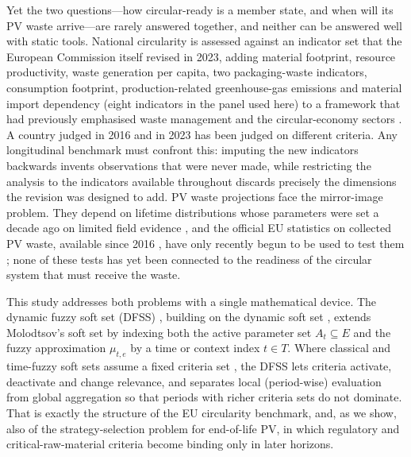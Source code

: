 \documentclass[a4paper,fleqn]{cas-sc}
\begin{document}
Yet the two questions---how circular-ready is a member state, and when will its PV waste arrive---are rarely answered together, and neither can be answered well with static tools. National circularity is assessed against an indicator set that the European Commission itself revised in 2023, adding material footprint, resource productivity, waste generation per capita, two packaging-waste indicators, consumption footprint, production-related greenhouse-gas emissions and material import dependency (eight indicators in the panel used here) to a framework that had previously emphasised waste management and the circular-economy sectors \citep{ec2023framework}. A country judged in 2016 and in 2023 has been judged on different criteria. Any longitudinal benchmark must confront this: imputing the new indicators backwards invents observations that were never made, while restricting the analysis to the indicators available throughout discards precisely the dimensions the revision was designed to add. PV waste projections face the mirror-image problem. They depend on lifetime distributions whose parameters were set a decade ago on limited field evidence \citep{irena2016}, and the official EU statistics on collected PV waste, available since 2016 \citep{eurostat_weee}, have only recently begun to be used to test them \citep{kastanaki2025,kastanaki2026,pitacco2026}; none of these tests has yet been connected to the readiness of the circular system that must receive the waste.

This study addresses both problems with a single mathematical device. The dynamic fuzzy soft set (DFSS) \citep{SAEED2026200504}, building on the dynamic soft set \citep{saeed2025introduction}, extends Molodtsov's soft set \citep{molodtsov1999} by indexing both the active parameter set $A_t\subseteq E$ and the fuzzy approximation $\mu_{t,e}$ by a time or context index $t\in T$. Where classical and time-fuzzy soft sets assume a fixed criteria set \citep{alcantud2018intertemporal,liu2020intertemporal}, the DFSS lets criteria activate, deactivate and change relevance, and separates local (period-wise) evaluation from global aggregation so that periods with richer criteria sets do not dominate. That is exactly the structure of the EU circularity benchmark, and, as we show, also of the strategy-selection problem for end-of-life PV, in which regulatory and critical-raw-material criteria become binding only in later horizons.
\end{document}
